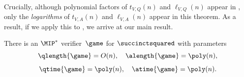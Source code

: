 Crucially, although polynomial factors of $t_{V,Q}(n)$ and $\ell_{V, Q}(n)$ appear in ,
only the \emph{logarithms} of $t_{V,A}(n)$ and $\ell_{V, A}(n)$ appear in this theorem.
As a result, if we apply this to , we arrive at our main result.

\begin{theorem}
  \label{thm:main}
There is an $\MIP^*$ verifier~$\game$ for $\succinctsquared$ with parameters
\begin{equation*}
\qlength{\game} =O(n), \quad
\alength{\game} = \poly(n),
\end{equation*}
\begin{equation*}
\qtime{\game} = \poly(n), \quad
\atime{\game} = \poly(n).
\end{equation*}
\end{theorem}







